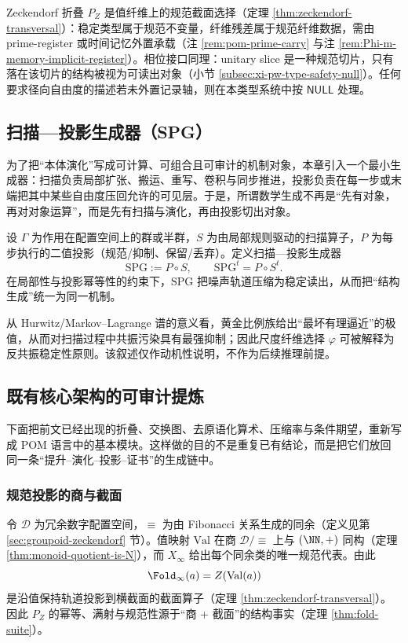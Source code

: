 \begin{remark}\label{rem:pom-gauge-zeck-phase-null}
Zeckendorf 折叠 \(P_Z\) 是值纤维上的规范截面选择（定理 \ref{thm:zeckendorf-transversal}）：稳定类型属于规范不变量，纤维残差属于规范纤维数据，需由 prime-register 或时间记忆外置承载（注 \ref{rem:pom-prime-carry} 与注 \ref{rem:Phi-m-memory-implicit-register}）。相位接口同理：unitary slice 是一种规范切片，只有落在该切片的结构被视为可读出对象（小节 \ref{subsec:xi-pw-type-safety-null}）。任何要求径向自由度的描述若未外置记录轴，则在本类型系统中按 \(\mathsf{NULL}\) 处理。
\end{remark}


\subsection{扫描—投影生成器（SPG）}\label{subsec:pom-spg}
为了把“本体演化”写成可计算、可组合且可审计的机制对象，本章引入一个最小生成器：扫描负责局部扩张、搬运、重写、卷积与同步推进，投影负责在每一步或末端把其中某些自由度压回允许的可见层。于是，所谓数学生成不再是“先有对象，再对对象运算”，而是先有扫描与演化，再由投影切出对象。

\begin{definition}[扫描—投影生成器]\label{def:pom-spg}
设 $\Gamma$ 为作用在配置空间上的群或半群，$S$ 为由局部规则驱动的扫描算子，$P$ 为每步执行的二值投影（规范/抑制、保留/丢弃）。定义扫描—投影生成器
\[
\mathrm{SPG}:=P\circ S,
\qquad
\mathrm{SPG}^t=P\circ S^t.
\]
在局部性与投影幂等性的约束下，$\mathrm{SPG}$ 把噪声轨道压缩为稳定读出，从而把“结构生成”统一为同一机制。
\end{definition}
\begin{remark}\label{rem:pom-anti-resonance}
从 Hurwitz/Markov--Lagrange 谱的意义看，黄金比例族给出“最坏有理逼近”的极值，从而对扫描过程中共振污染具有最强抑制；因此尺度纤维选择 $\varphi$ 可被解释为反共振稳定性原则。该叙述仅作动机性说明，不作为后续推理前提。
\end{remark}

\subsection{既有核心架构的可审计提炼}\label{subsec:pom-hard-skeleton}
下面把前文已经出现的折叠、交换图、去原语化算术、压缩率与条件期望，重新写成 POM 语言中的基本模块。这样做的目的不是重复已有结论，而是把它们放回同一条“提升--演化--投影--证书”的生成链中。

\subsubsection{规范投影的商与截面}\label{subsec:pom-quotient-section}
令 $\mathcal{D}$ 为冗余数字配置空间，$\equiv$ 为由 Fibonacci 关系生成的同余（定义见第 \ref{sec:groupoid-zeckendorf} 节）。值映射 $\mathrm{Val}$ 在商 $\mathcal{D}/\!\equiv$ 上与 $(\NN,+)$ 同构（定理 \ref{thm:monoid-quotient-is-N}），而 $X_\infty$ 给出每个同余类的唯一规范代表。由此
\[
\Fold_\infty(a)=Z(\mathrm{Val}(a))
\]
是沿值保持轨道投影到横截面的截面算子（定理 \ref{thm:zeckendorf-transversal}）。因此 $P_Z$ 的幂等、满射与规范性源于“商 + 截面”的结构事实（定理 \ref{thm:fold-suite}）。

